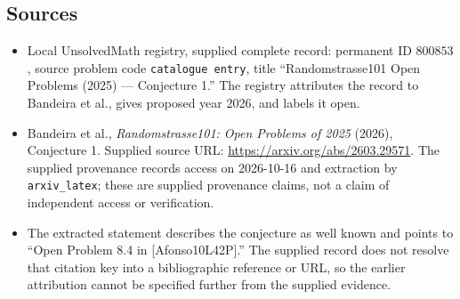 \documentclass[11pt]{article}
\begin{document}
\subsection{Sources}
\begin{itemize}
\item Local UnsolvedMath registry, supplied complete record: permanent ID \(800853\), source problem code \texttt{catalogue entry}, title ``Randomstrasse101 Open Problems (2025) --- Conjecture 1.'' The registry attributes the record to Bandeira et al., gives proposed year 2026, and labels it open.
\item Bandeira et al., \emph{Randomstrasse101: Open Problems of 2025} (2026), Conjecture 1. Supplied source URL: \url{https://arxiv.org/abs/2603.29571}. The supplied provenance records access on 2026-10-16 and extraction by \texttt{arxiv\_latex}; these are supplied provenance claims, not a claim of independent access or verification.
\item The extracted statement describes the conjecture as well known and points to ``Open Problem 8.4 in [Afonso10L42P].'' The supplied record does not resolve that citation key into a bibliographic reference or URL, so the earlier attribution cannot be specified further from the supplied evidence.
\end{itemize}
\end{document}
